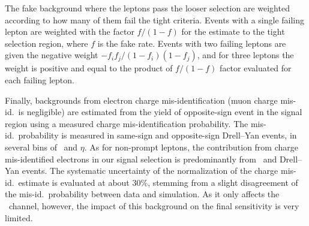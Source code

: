 The fake background where the leptons pass the looser selection are weighted according to how many of them fail the tight criteria.   
Events with a single failing lepton are weighted with the factor $f/(1-f)$ for the estimate to the tight selection region, where $f$ is the fake rate. 
Events with two failing leptons are given the negative weight $-f_{i}f_{j}/(1-f_{i})(1-f_{j})$, and for three leptons the weight is positive and equal to the product of $f/(1-f)$ factor evaluated for each failing lepton.

Finally, backgrounds from electron charge mis-identification (muon charge mis-id.\ is negligible) are estimated from the yield of opposite-sign event in the signal region using a measured charge mis-identification probability.
The mis-id.\ probability is measured in same-sign and opposite-sign Drell--Yan events, in several bins of \pt\ and $\eta$.
As for non-prompt leptons, the contribution from charge mis-identified electrons in our signal selection is predominantly from \ttbar\ and Drell--Yan events.
The systematic uncertainty of the normalization of the charge mis-id.\ estimate is evaluated at about 30\%, stemming from a slight disagreement of the mis-id.\ probability between data and simulation.
As it only affects the \Pe\Pgm\ channel, however, the impact of this background on the final sensitivity is very limited.

